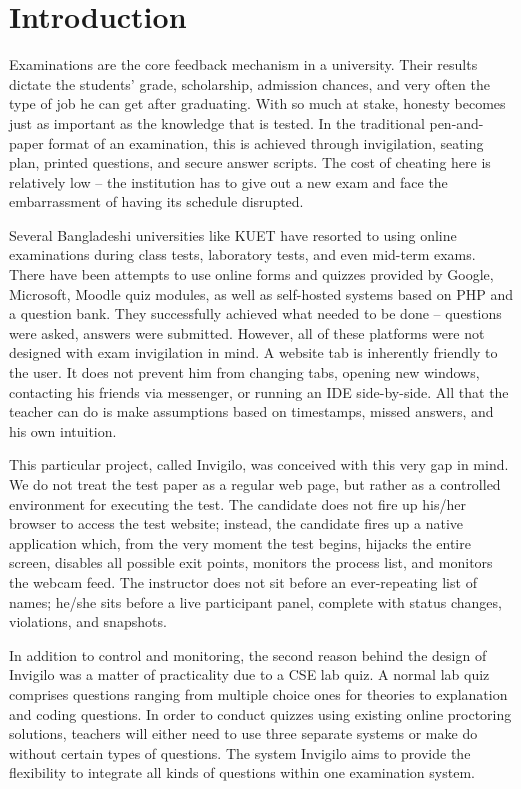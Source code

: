 \documentclass[12pt, a4paper]{report}
\begin{document}
\section{Introduction}

\begin{justify}
  {\fontsize{12}{18}\selectfont
    Examinations are the core feedback mechanism in a university. Their results dictate the students' grade, scholarship, admission chances, and very often the type of job he can get after graduating. With so much at stake, honesty becomes just as important as the knowledge that is tested. In the traditional pen-and-paper format of an examination, this is achieved through invigilation, seating plan, printed questions, and secure answer scripts. The cost of cheating here is relatively low – the institution has to give out a new exam and face the embarrassment of having its schedule disrupted.

    Several Bangladeshi universities like KUET have resorted to using online examinations during class tests, laboratory tests, and even mid-term exams. There have been attempts to use online forms and quizzes provided by Google, Microsoft, Moodle quiz modules, as well as self-hosted systems based on PHP and a question bank. They successfully achieved what needed to be done – questions were asked, answers were submitted. However, all of these platforms were not designed with exam invigilation in mind. A website tab is inherently friendly to the user. It does not prevent him from changing tabs, opening new windows, contacting his friends via messenger, or running an IDE side-by-side. All that the teacher can do is make assumptions based on timestamps, missed answers, and his own intuition.

    This particular project, called Invigilo, was conceived with this very gap in mind. We do not treat the test paper as a regular web page, but rather as a controlled environment for executing the test. The candidate does not fire up his/her browser to access the test website; instead, the candidate fires up a native application which, from the very moment the test begins, hijacks the entire screen, disables all possible exit points, monitors the process list, and monitors the webcam feed. The instructor does not sit before an ever-repeating list of names; he/she sits before a live participant panel, complete with status changes, violations, and snapshots.

    In addition to control and monitoring, the second reason behind the design of Invigilo was a matter of practicality due to a CSE lab quiz. A normal lab quiz comprises questions ranging from multiple choice ones for theories to explanation and coding questions. In order to conduct quizzes using existing online proctoring solutions, teachers will either need to use three separate systems or make do without certain types of questions. The system Invigilo aims to provide the flexibility to integrate all kinds of questions within one examination system.

}
\end{justify}
\end{document}
